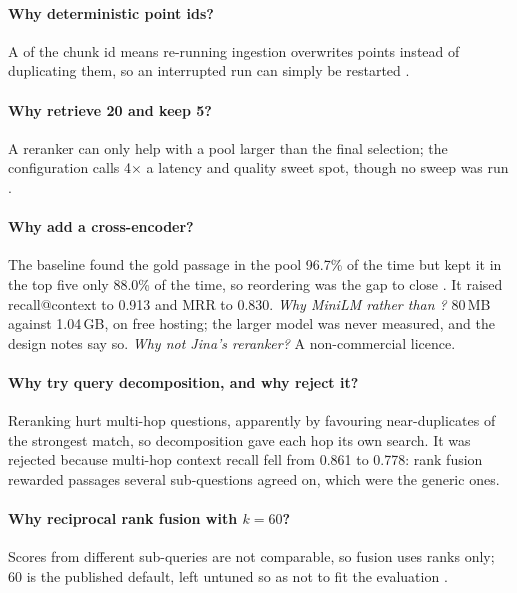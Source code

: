 \paragraph{Why deterministic point ids?} A  of the chunk id means re-running ingestion overwrites points instead of duplicating them, so an interrupted run can simply be restarted .

\paragraph{Why retrieve 20 and keep 5?} A reranker can only help with a pool larger than the final selection; the configuration calls 4$\times$ a latency and quality sweet spot, though no sweep was run .

\paragraph{Why add a cross-encoder?} The baseline found the gold passage in the pool 96.7\% of the time but kept it in the top five only 88.0\% of the time, so reordering was the gap to close . It raised recall@context to 0.913 and MRR to 0.830. \emph{Why MiniLM rather than ?} 80\,MB against 1.04\,GB, on free hosting; the larger model was never measured, and the design notes say so. \emph{Why not Jina's reranker?} A non-commercial licence.

\paragraph{Why try query decomposition, and why reject it?} Reranking hurt multi-hop questions, apparently by favouring near-duplicates of the strongest match, so decomposition gave each hop its own search. It was rejected because multi-hop context recall fell from 0.861 to 0.778: rank fusion rewarded passages several sub-questions agreed on, which were the generic ones.

\paragraph{Why reciprocal rank fusion with $k = 60$?} Scores from different sub-queries are not comparable, so fusion uses ranks only; 60 is the published default, left untuned so as not to fit the evaluation .

